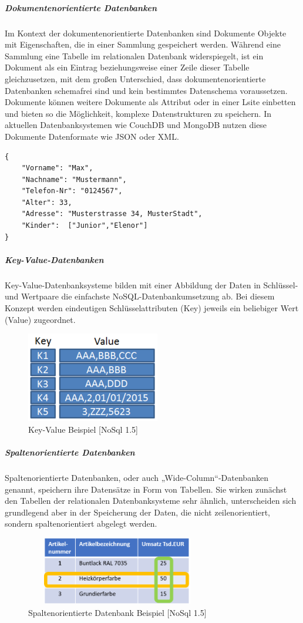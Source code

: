\subparagraph{Dokumentenorientierte Datenbanken}
Im Kontext der dokumentenorientierte Datenbanken sind Dokumente Objekte mit Eigenschaften, die in einer Sammlung gespeichert werden. Während eine Sammlung eine Tabelle im relationalen Datenbank widerspiegelt, ist ein Dokument als ein Eintrag beziehungsweise einer Zeile dieser Tabelle gleichzusetzen, mit dem großen Unterschied, dass dokumentenorientierte Datenbanken schemafrei sind und kein bestimmtes Datenschema voraussetzen. Dokumente können weitere Dokumente als Attribut oder in einer Lsite einbetten und bieten so die Möglichkeit, komplexe Datenstrukturen zu speichern.  In aktuellen Datenbanksystemen wie CouchDB und MongoDB nutzen diese Dokumente Datenformate wie JSON oder XML. 

\begin{lstlisting}
{
	"Vorname": "Max",
	"Nachname": "Mustermann",
	"Telefon-Nr": "0124567",
	"Alter": 33,
	"Adresse": "Musterstrasse 34, MusterStadt",
	"Kinder":  ["Junior","Elenor"]
}
\end{lstlisting}


\subparagraph{Key-Value-Datenbanken}
Key-Value-Datenbanksysteme bilden mit einer Abbildung der Daten in Schlüssel- und Wertpaare die einfachste NoSQL-Datenbankumsetzung ab. Bei diesem Konzept werden eindeutigen Schlüsselattributen (Key) jeweils ein beliebiger Wert (Value) zugeordnet. 

\begin{figure}[h]
\centering
\includegraphics[]{images/KeyValue.PNG}
\caption{Key-Value Beispiel [NoSql 1.5]}
\end{figure}

\subparagraph{Spaltenorientierte Datenbanken}
Spaltenorientierte Datenbanken, oder auch „Wide-Column“-Datenbanken genannt, speichern ihre Datensätze in Form von Tabellen.  Sie wirken zunächst den Tabellen der relationalen Datenbanksysteme sehr ähnlich, unterscheiden sich grundlegend aber in der Speicherung der Daten, die nicht zeilenorientiert, sondern spaltenorientiert abgelegt werden. 


\begin{figure}[h]
\centering
\includegraphics[width=8cm, height = 3cm]{images/SpaltenorientiereDatenbank.png}
\caption{Spaltenorientierte Datenbank Beispiel [NoSql 1.5]}
\end{figure}

